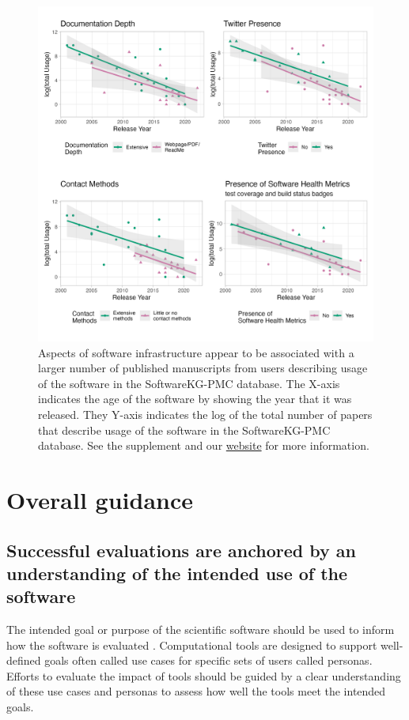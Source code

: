 \documentclass{article}
\begin{document}
\begin{figure}[ht]
    \centering
\includegraphics[width=\textwidth,height=\textheight,keepaspectratio]{images/logUsage_stratified_2x2.png}
    \caption{Aspects of software infrastructure appear to be associated with a larger number of published manuscripts from users describing usage of the software in the SoftwareKG-PMC database. The X-axis indicates the age of the software by showing the year that it was released. They Y-axis indicates the log of the total number of papers that describe usage of the software in the SoftwareKG-PMC database. See the supplement and our \href{https://hutchdatascience.org/ITCR_Metrics_manuscript_website/}{website} for more information.}
    \label{fig:inf_cit}
\end{figure}



\section{Overall guidance}





\subsection{Successful evaluations are anchored by an understanding of the intended use of the software}
\label{sec:use_understanding}
The intended goal or purpose of the scientific software should be used to inform how the software is evaluated \cite{Basili94}. Computational tools are designed to support well-defined goals often called use cases \cite{gamma_design_1995} for specific sets of users called personas\cite{cooper_inmates_2004}. Efforts to evaluate the impact of tools should be guided by a clear understanding of these use cases and personas to assess how well the tools meet the intended goals. 
\end{document}
